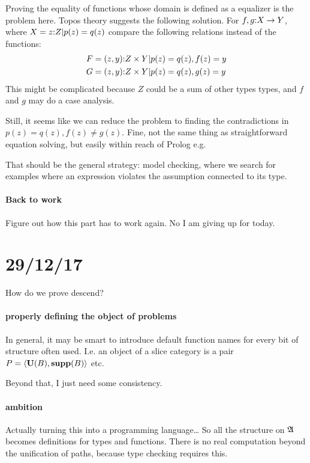 \documentclass[csh.tex]{subfiles}
\begin{document}
Proving the equality of functions whose domain is defined as a equalizer is the problem here. Topos theory suggests the following solution. For $f,g\mathord : X \to Y$, where $X = {z\mathord : Z|p(z)=q(z)}$
compare the following relations instead of the functions:
\begin{align*} 
F &= { (z,y)\mathord : Z\times Y | p(z)=q(z),f(z) = y } \\
G &= { (z,y)\mathord : Z\times Y | p(z)=q(z),g(z) = y } \\
\end{align*}
This might be complicated because $Z$ could be a sum of other types types, and $f$ and $g$ may do a case analysis.

Still, it seems like we can reduce the problem to finding the contradictions in $p(z)=q(z),f(z) \neq g(z)$. Fine, not the same thing as straightforward equation solving, but easily within reach of Prolog e.g.

That should be the general strategy: model checking, where we search for examples where an expression violates the assumption connected to its type.

\paragraph{Back to work}
Figure out how this part has to work again.
No I am giving up for today.

\section{29/12/17}
How do we prove descend?


\paragraph{properly defining the object of problems}

In general, it may be smart to introduce default function names
for every bit of structure often used. I.e. an object of a slice category is a pair $P = \left\langle \mathbf{U}(B),\mathbf{supp}(B) \right\rangle$ etc.

Beyond that, I just need some consistency.


\paragraph{ambition}
Actually turning this into a programming language\dots
So all the structure on $\mathfrak A$ becomes definitions for types and functions. There is no real computation beyond the unification of paths, because type checking requires this.
\end{document}
